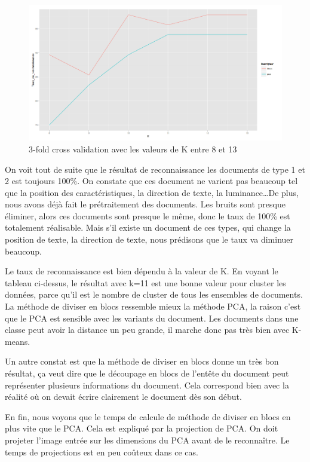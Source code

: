 \documentclass[french,12pt,a4paper,oneside,notitlepage]{report}
\begin{document}
\begin{figure}[ht]
	\begin{center}
	  \includegraphics[width=12cm]{series.png}
	\end{center}
	 \caption{3-fold cross validation avec les valeurs de K entre 8 et 13}
	 \label{fig: K 8a13}
\end{figure}

On voit tout de suite que le résultat de reconnaissance les documents de type 1 et 2 est toujours 100\%. On constate que ces document ne varient pas beaucoup tel que la position des caractéristiques, la direction de texte, la luminance\dots De plus, nous avons déjà fait le prétraitement des documents. Les bruits sont presque éliminer, alors ces documents sont presque le même, donc le taux de 100\% est totalement réalisable. Mais s'il existe un document de ces types, qui change la position de texte, la direction de texte, nous prédisons que le taux va diminuer beaucoup.

Le taux de reconnaissance est bien dépendu à la valeur de K. En voyant le tableau ci-dessus, le résultat avec k=11 est une bonne valeur pour cluster les données, parce qu'il est le nombre de cluster de tous les ensembles de documents. La méthode de diviser en blocs ressemble mieux la méthode PCA, la raison c'est que le PCA est sensible avec les variants du document. Les documents dans une classe peut avoir la distance un peu grande, il marche donc pas très bien avec K-means. 

Un autre constat est que la méthode de diviser en blocs donne un très bon résultat, ça veut dire que le découpage en blocs de l’entête du document peut représenter plusieurs informations du document. Cela correspond bien avec la réalité où on devait écrire clairement le document dès son début.

En fin, nous voyons que le temps de calcule de méthode de diviser en blocs en plus vite que le PCA. Cela est expliqué par la projection de PCA. On doit projeter l'image entrée sur les dimensions du PCA avant de le reconnaître. Le temps de projections est en peu coûteux dans ce cas.
\end{document}
